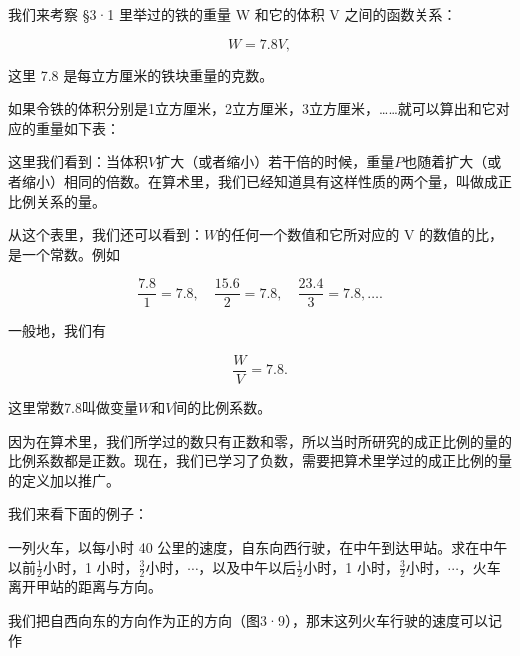 我们来考察 §3·1 里举过的铁的重量 W 和它的体积 V 之间的函数关系：

\[
W = 7.8 V,
\]

这里 7.8 是每立方厘米的铁块重量的克数。

如果令铁的体积分别是1立方厘米，2立方厘米，3立方厘米，\ldots\ldots 就可以算出和它对应的重量如下表：

\begin{figure}
\centering
\end{figure}

这里我们看到：当体积\(V\)扩大（或者缩小）若干倍的时候，重量\(P\)也随着扩大（或者缩小）相同的倍数。在算术里，我们已经知道具有这样性质的两个量，叫做成正比例关系的量。

从这个表里，我们还可以看到：\(W\)的任何一个数值和它所对应的 V
的数值的比，是一个常数。例如

\[
\frac{7.8}{1} = 7.8, \quad \frac{15.6}{2} = 7.8, \quad \frac{23.4}{3} = 7.8, \dots.
\]

一般地，我们有

\[
\frac{W}{V} = 7.8.
\]

这里常数7.8叫做变量\(W\)和\(V\)间的比例系数。

因为在算术里，我们所学过的数只有正数和零，所以当时所研究的成正比例的量的比例系数都是正数。现在，我们已学习了负数，需要把算术里学过的成正比例的量的定义加以推广。

我们来看下面的例子：

一列火车，以每小时 40
公里的速度，自东向西行驶，在中午到达甲站。求在中午以前\(\frac{1}{2}\)小时，1
小时，\(\frac{3}{2}\)小时，\(\cdots\)，以及中午以后\(\frac{1}{2}\)小时，1
小时，\(\frac{3}{2}\)小时，\(\cdots\)，火车离开甲站的距离与方向。

我们把自西向东的方向作为正的方向（图3·9），那末这列火车行驶的速度可以记作

